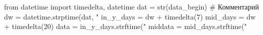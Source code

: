 \begin{pycode}	
from datetime import timedelta, datetime
dat = str(data_begin)
# Комментарий
dw = datetime.strptime(dat, "%
in_y_days = dw + timedelta(7)
mid_days = dw + timedelta(20)
data = in_y_days.strftime("%
middata = mid_days.strftime("%

\end{pycode}


%
%
%
%
%
%
